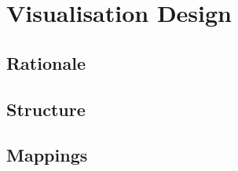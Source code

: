 
\chapter{Visualisation Design}
\label{cha:design}

\section{Rationale}

\section{Structure}

\section{Mappings}
